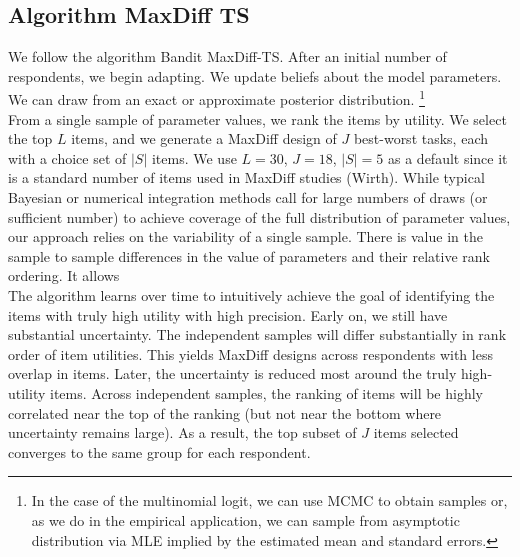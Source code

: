 \documentclass[mksc,blindrev]{informs3} %
\begin{document}
\subsection{Algorithm MaxDiff TS}
\begin{algorithmic}
  \ENDFOR
{}
\ENDFOR
\end{algorithmic}
We follow the algorithm Bandit MaxDiff-TS. After an initial number of respondents, we begin adapting. We update beliefs about the model parameters. We can draw from an exact or approximate posterior distribution. \footnote{In the case of the multinomial logit, we can use MCMC to obtain samples or, as we do in the empirical application, we can sample from asymptotic distribution via MLE implied by the estimated mean and standard errors.}\\
From a single sample of parameter values, we rank the items by utility. We select the top $L$ items, and we generate a MaxDiff design of $J$ best-worst tasks, each with a choice set of $|S|$ items.  We use $L=30$, $J=18$, $|S|=5$ as a default since it is a standard number of items used in MaxDiff studies (Wirth). 
While typical Bayesian or numerical integration methods call for large numbers of draws (or sufficient number) to achieve coverage of the full distribution of parameter values, our  approach relies on the variability of a single sample. There is value in the sample to sample differences in the value of parameters and their relative rank ordering. It allows  \\
The algorithm learns over time to intuitively achieve the goal of identifying the items with truly high utility with high precision. Early on, we still have substantial uncertainty. The independent samples will differ substantially in rank order of item utilities. This yields MaxDiff designs across respondents with less overlap in items. Later, the uncertainty is reduced most around the truly high-utility items. Across independent samples, the ranking of items will be highly correlated near the top of the ranking (but not near the bottom where uncertainty remains large). As a result, the top subset of $J$ items selected converges to the same group for each respondent. \\
\end{document}
